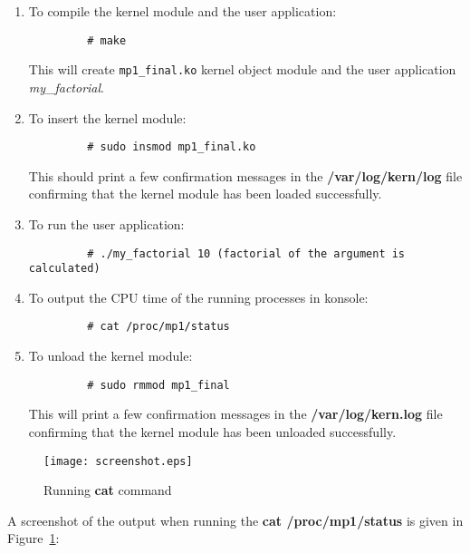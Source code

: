 \documentclass[11pt]{article}
\begin{document}
\begin{enumerate}
    \item To compile the kernel module and the user application:
        \begin{verbatim}
         # make
        \end{verbatim}
        This will create {\tt mp1\_final.ko} kernel object module and the user application {\em my\_factorial}.
    \item To insert the kernel module:
        \begin{verbatim}
         # sudo insmod mp1_final.ko
        \end{verbatim}
        This should print a few confirmation messages in the {\bf /var/log/kern/log} file confirming that the kernel module has been loaded successfully.
    \item To run the user application:
        \begin{verbatim}
         # ./my_factorial 10 (factorial of the argument is calculated)
        \end{verbatim}
    \item To output the CPU time of the running processes in konsole:
        \begin{verbatim}
         # cat /proc/mp1/status
        \end{verbatim}
    \item To unload the kernel module:
        \begin{verbatim}
         # sudo rmmod mp1_final
        \end{verbatim}
        This will print a few confirmation messages in the {\bf /var/log/kern.log} file confirming that the kernel module has been unloaded successfully.
\end{enumerate}

\begin{figure}
	\texttt{[image: screenshot.eps]}
	\caption{Running {\bf cat} command\label{fig:cat}}
\end{figure}

A screenshot of the output when running the {\bf cat /proc/mp1/status} is given in Figure~\ref{fig:cat}:
\end{document}
